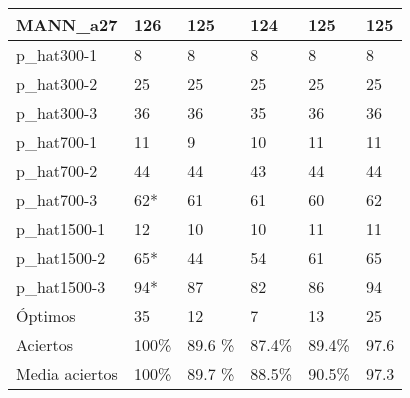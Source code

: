 \begin{table}[H]
\begin{tabular}{|l|l|l|l|l|l|}
MANN\_a27          & 126 & 125 & 124 & 125 & 125 \\ \hline
p\_hat300-1        & 8 & 8 & 8 & 8 & 8 \\ \hline
p\_hat300-2        & 25 & 25 & 25 & 25 & 25 \\ \hline
p\_hat300-3        & 36 & 36 & 35 & 36 & 36 \\ \hline
p\_hat700-1        & 11 & 9 & 10 & 11 & 11 \\ \hline
p\_hat700-2        & 44 & 44 & 43 & 44 & 44 \\ \hline
p\_hat700-3        & 62* & 61 & 61 & 60 & 62 \\ \hline
p\_hat1500-1       & 12 & 10 & 10 & 11 & 11 \\ \hline
p\_hat1500-2       & 65* & 44 & 54 & 61 & 65 \\ \hline
p\_hat1500-3       & 94* & 87 & 82 & 86 & 94 \\ \hline
Óptimos            & 35  & 12 & 7 & 13 & 25 \\ \hline
Aciertos           & 100\% & 89.6 \% & 87.4\% & 89.4\% & 97.6 \\ \hline
Media aciertos     & 100\% & 89.7 \% & 88.5\% & 90.5\% & 97.3 \\ \hline
\end{tabular}
\end{table}

\fi
